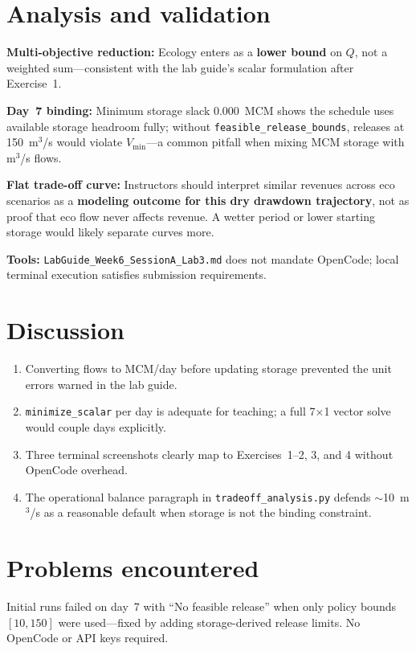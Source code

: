 \documentclass[11pt,a4paper]{article}
\begin{document}
\section{Analysis and validation}

\textbf{Multi-objective reduction:} Ecology enters as a \textbf{lower bound} on $Q$, not a weighted sum---consistent with the lab guide's scalar formulation after Exercise~1.

\textbf{Day~7 binding:} Minimum storage slack 0.000~MCM shows the schedule uses available storage headroom fully; without \texttt{feasible\_release\_bounds}, releases at 150~m$^3$/s would violate $V_{\min}$---a common pitfall when mixing MCM storage with m$^3$/s flows.

\textbf{Flat trade-off curve:} Instructors should interpret similar revenues across eco scenarios as a \textbf{modeling outcome for this dry drawdown trajectory}, not as proof that eco flow never affects revenue. A wetter period or lower starting storage would likely separate curves more.

\textbf{Tools:} \texttt{LabGuide\_Week6\_SessionA\_Lab3.md} does not mandate OpenCode; local terminal execution satisfies submission requirements.

\section{Discussion}
\begin{enumerate}[noitemsep]
  \item Converting flows to MCM/day before updating storage prevented the unit errors warned in the lab guide.
  \item \texttt{minimize\_scalar} per day is adequate for teaching; a full 7$\times$1 vector solve would couple days explicitly.
  \item Three terminal screenshots clearly map to Exercises~1--2, 3, and 4 without OpenCode overhead.
  \item The operational balance paragraph in \texttt{tradeoff\_analysis.py} defends $\sim$10~m$^3$/s as a reasonable default when storage is not the binding constraint.
\end{enumerate}

\section{Problems encountered}
Initial runs failed on day~7 with ``No feasible release'' when only policy bounds $[10,150]$ were used---fixed by adding storage-derived release limits. No OpenCode or API keys required.
\end{document}

